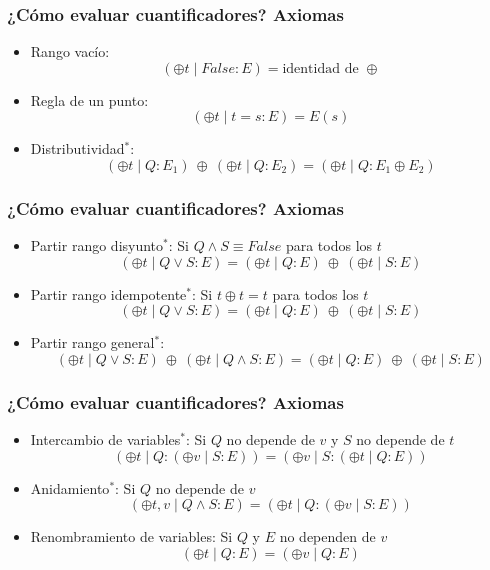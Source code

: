 \documentclass{beamer}
\begin{document}
\begin{frame}[fragile]
    \frametitle{¿Cómo evaluar cuantificadores? Axiomas}
    \begin{itemize}
        \item Rango vacío: 
            $$(\oplus t \mid False: E) = \text{identidad de }\oplus$$
        \item Regla de un punto:
            $$(\oplus t \mid t = s: E) = E(s)$$
        \item Distributividad$^{*}$:
            $$(\oplus t \mid Q: E_{1})\ \oplus\ (\oplus t \mid Q: E_{2}) = (\oplus t \mid Q: E_1 \oplus E_2)$$
    \end{itemize}
\end{frame}

\begin{frame}[fragile]
    \frametitle{¿Cómo evaluar cuantificadores? Axiomas}
    \begin{itemize}
        \item Partir rango disyunto$^{*}$: Si $Q \land S \equiv False$ para todos los $t$
            $$(\oplus t \mid Q \lor S : E) = (\oplus t \mid Q : E)\ \oplus\ (\oplus t \mid S : E)$$
        \item Partir rango idempotente$^{*}$: Si $t \oplus t = t$ para todos los $t$
            $$(\oplus t \mid Q \lor S : E) = (\oplus t \mid Q : E)\ \oplus\ (\oplus t \mid S : E)$$
        \item Partir rango general$^{*}$:
            $$(\oplus t \mid Q \lor S : E)\ \oplus\ (\oplus t \mid Q \land S : E) = (\oplus t \mid Q : E)\ \oplus\ (\oplus t \mid S : E)$$
    \end{itemize}
\end{frame}

\begin{frame}[fragile]
    \frametitle{¿Cómo evaluar cuantificadores? Axiomas}
    \begin{itemize}
        \item Intercambio de variables$^{*}$: Si $Q$ no depende de $v$ y $S$ no depende de $t$
            $$(\oplus t \mid Q : (\oplus v \mid S : E)) = (\oplus v \mid S : (\oplus t \mid Q : E))$$
        \item Anidamiento$^{*}$: Si $Q$ no depende de $v$
            $$(\oplus t,v \mid Q \land S : E) = (\oplus t \mid Q : (\oplus v \mid S : E))$$
        \item Renombramiento de variables: Si $Q$ y $E$ no dependen de $v$
            $$(\oplus t \mid Q : E) = (\oplus v \mid Q : E)$$
    \end{itemize}
\end{frame}
\end{document}
